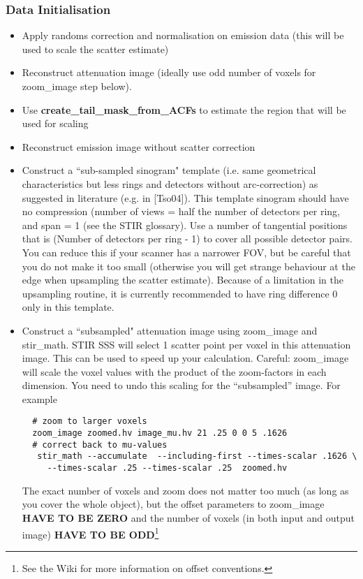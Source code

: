 \documentclass{article}
\begin{document}
\subsubsection{Data Initialisation}
\begin{itemize}
\item Apply randoms correction and normalisation on emission data (this will be used to scale the scatter estimate)
\item Reconstruct attenuation image (ideally use odd number of voxels for zoom\_image step below).
\item Use \textbf{create\_tail\_mask\_from\_ACFs} to estimate the region that will be used for scaling
\item Reconstruct emission image without scatter correction
\item Construct a ``sub-sampled sinogram" template (i.e. same geometrical characteristics but
less rings and detectors without arc-correction) as suggested in literature (e.g. in [Tso04]). This template
sinogram should have no compression (number of views = half the number of detectors per ring, and span = 1 (see the
STIR glossary). 
Use a number of tangential positions that is (Number of detectors per ring - 1) to cover all possible
detector pairs. You can reduce this if your scanner has a narrower FOV, but be careful that you do not 
make it too small (otherwise you will get strange behaviour at the edge when upsampling the scatter estimate).
Because of a limitation in the upsampling routine, it is currently recommended to have ring difference 0 only in this
template.
\item Construct a ``subsampled" attenuation image using zoom\_image and stir\_math. 
 STIR SSS will select 1 scatter point per voxel in this attenuation image. This can be used to speed up your
 calculation.
 Careful: zoom\_image will scale the voxel values with the product of the zoom-factors in each dimension. 
 You need to undo this scaling for the ``subsampled'' image.    
 For example
 \begin{verbatim}
  # zoom to larger voxels 
  zoom_image zoomed.hv image_mu.hv 21 .25 0 0 5 .1626
  # correct back to mu-values
   stir_math --accumulate  --including-first --times-scalar .1626 \
     --times-scalar .25 --times-scalar .25  zoomed.hv
 \end{verbatim}
  The exact number of voxels and zoom does not matter too much (as long as you cover the 
  whole object), but the offset parameters to zoom\_image
  \textbf{HAVE TO BE ZERO} and the number of voxels (in both input and output image)
  \textbf{HAVE TO BE ODD}\footnote{See the Wiki for more information on offset conventions.}
\end{itemize}
\end{document}
